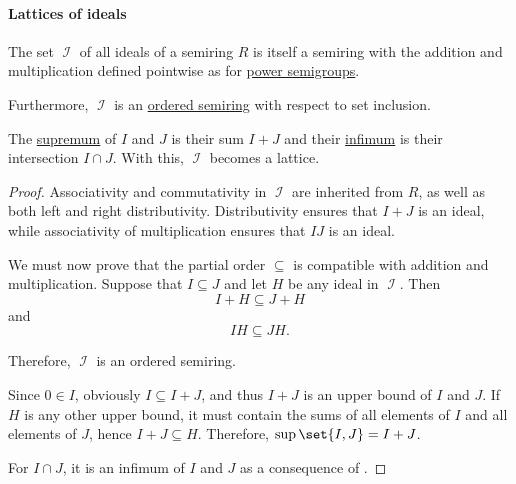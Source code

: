 \paragraph{Lattices of ideals}

\begin{proposition}\label{thm:semiring_of_ideals}
  \hfill
  \begin{thmenum}
     The set \( \mscrI \) of all ideals of a semiring \( R \) is itself a semiring with the addition and multiplication defined pointwise as for \hyperref[def:power_semigroup]{power semigroups}.

     Furthermore, \( \mscrI \) is an \hyperref[def:ordered_semiring]{ordered semiring} with respect to set inclusion.

     The \hyperref[def:extremal_points/supremum_and_infimum]{supremum} of \( I \) and \( J \) is their sum \( I + J \) and their \hyperref[def:extremal_points/supremum_and_infimum]{infimum} is their intersection \( I \cap J \). With this, \( \mscrI \) becomes a lattice.
  \end{thmenum}
\end{proposition}
\begin{proof}
   Associativity and commutativity in \( \mscrI \) are inherited from \( R \), as well as both left and right distributivity. Distributivity ensures that \( I + J \) is an ideal, while associativity of multiplication ensures that \( IJ \) is an ideal.

   We must now prove that the partial order \( \subseteq \) is compatible with addition and multiplication. Suppose that \( I \subseteq J \) and let \( H \) be any ideal in \( \mscrI \). Then
  \begin{equation*}
    I + H \subseteq J + H
  \end{equation*}
  and
  \begin{equation*}
    IH \subseteq JH.
  \end{equation*}

  Therefore, \( \mscrI \) is an ordered semiring.

   Since \( 0 \in I \), obviously \( I \subseteq I + J \), and thus \( I + J \) is an upper bound of \( I \) and \( J \). If \( H \) is any other upper bound, it must contain the sums of all elements of \( I \) and all elements of \( J \), hence \( I + J \subseteq H \). Therefore, \( \sup\set{I, J} = I + J \).

  For \( I \cap J \), it is an infimum of \( I \) and \( J \) as a consequence of .
\end{proof}

